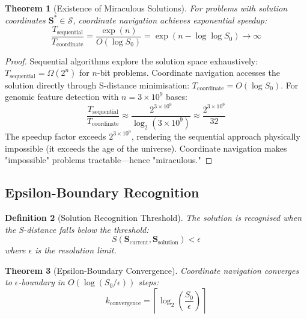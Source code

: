 \documentclass[11pt,a4paper]{article}
\newtheorem{theorem}{Theorem}[section]
\newtheorem{definition}[theorem]{Definition}
\theoremstyle{remark}
\newcommand{\Sspace}{\mathcal{S}}
\newcommand{\Scoord}{\mathbf{S}}
\begin{document}
\begin{theorem}[Existence of Miraculous Solutions]
\label{thm:miraculous_existence}
For problems with solution coordinates $\Scoord^* \in \Sspace$, coordinate navigation achieves exponential speedup:
\begin{equation}
\frac{T_{\text{sequential}}}{T_{\text{coordinate}}} = \frac{\exp(n)}{O(\log S_0)} = \exp\left(n - \log\log S_0\right) \to \infty
\end{equation}
\end{theorem}

\begin{proof}
Sequential algorithms explore the solution space exhaustively: $T_{\text{sequential}} = \Omega(2^n)$ for $n$-bit problems. Coordinate navigation accesses the solution directly through S-distance minimisation: $T_{\text{coordinate}} = O(\log S_0)$. For genomic feature detection with $n = 3 \times 10^9$ bases:
\begin{equation}
\frac{T_{\text{sequential}}}{T_{\text{coordinate}}} \approx \frac{2^{3 \times 10^9}}{\log_2(3 \times 10^9)} \approx \frac{2^{3 \times 10^9}}{32}
\end{equation}
The speedup factor exceeds $2^{3 \times 10^9}$, rendering the sequential approach physically impossible (it exceeds the age of the universe). Coordinate navigation makes "impossible" problems tractable—hence "miraculous."
\end{proof}

\subsection{Epsilon-Boundary Recognition}

\begin{definition}[Solution Recognition Threshold]
\label{def:epsilon_boundary}
The solution is recognised when the S-distance falls below the threshold:
\begin{equation}
S(\Scoord_{\text{current}}, \Scoord_{\text{solution}}) < \epsilon
\end{equation}
where $\epsilon$ is the resolution limit.
\end{definition}

\begin{theorem}[Epsilon-Boundary Convergence]
\label{thm:epsilon_convergence}
Coordinate navigation converges to $\epsilon$-boundary in $O(\log(S_0/\epsilon))$ steps:
\begin{equation}
k_{\text{convergence}} = \left\lceil\log_2\left(\frac{S_0}{\epsilon}\right)\right\rceil
\end{equation}
\end{theorem}
\end{document}
